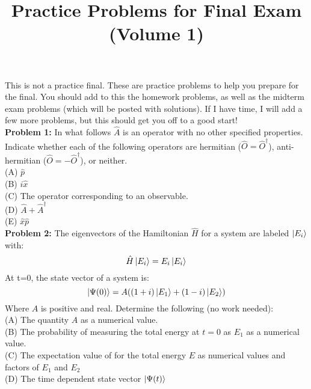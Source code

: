 \documentclass[12pt]{article}
\begin{document}
\newcommand{\ihbar}{\ensuremath{i \hbar}}
\newcommand{\dPsidt}{\ensuremath{ \frac{\partial \Psi}{\partial t} }}
\newcommand{\dPsidx}{\ensuremath{ \frac{\partial \Psi}{\partial x} }}
\newcommand{\ddPsidx}{\ensuremath{ \frac{\partial^2 \Psi}{\partial x^2} }}
\newcommand{\dPssdt}{\ensuremath{ \frac{\partial \Psi^*}{\partial t} }}
\newcommand{\dPssdx}{\ensuremath{ \frac{\partial \Psi^*}{\partial x} }}
\newcommand{\ddPssdx}{\ensuremath{ \frac{\partial^2 \Psi^*}{\partial x^2} }}

\newcommand{\dphidt}{\ensuremath{ \frac{d \phi}{dt} }}
\newcommand{\dpsidx}{\ensuremath{ \frac{d \psi}{dx} }}
\newcommand{\ddpsidx}{\ensuremath{ \frac{d^2 \psi}{dx^2} }}


\date{\vspace{-5ex}}

\title{Practice Problems for Final Exam (Volume 1)}

\maketitle

This is not a practice final.  These are practice problems to help you prepare for the final.  You should add to this the homework problems, as well as the midterm exam problems (which will be posted with solutions).  If I have time, I will add a few more problems, but this should get you off to a good start!\\[5pt]

\noindent
{\bf Problem 1:}
In what follows $\hat{A}$ is an operator with no other specified properties.  Indicate whether each of the following operators are hermitian ($\hat{O}=\hat{O}^\dagger$), anti-hermitian ($\hat{O}=-\hat{O}^\dagger$), or neither.\\[5pt]
(A) $\hat{p}$ \\[5pt]
(B) $i \hat{x}$ \\[5pt]
(C) The operator corresponding to an observable. \\[5pt]
(D) $\hat{A} + \hat{A}^\dagger$ \\[5pt] 
(E) $\hat{x} \hat{p}$\\[5pt]

\noindent
{\bf Problem 2:}
The eigenvectors of the Hamiltonian $\hat{H}$ for a system are labeled $\ket{E_i}$ with:
$$\hat{H} \ket{E_i} = E_i \ket{E_i}$$
At t=0, the state vector of a system is:
$$\ket{\Psi(0)} = A((1+i)\ket{E_1} + (1-i)\ket{E_2})$$
Where $A$ is positive and real.  Determine the following (no work needed):\\[5pt]
(A) The quantity $A$ as a numerical value.\\[5pt]
(B) The probability of measuring the total energy at $t=0$ as $E_1$ as a numerical value.\\[5pt]
(C) The expectation value of for the total energy $E$ as numerical values and factors of $E_1$ and $E_2$\\[5pt]
(D) The time dependent state vector $\ket{\Psi(t)}$\\[5pt]
\end{document}
